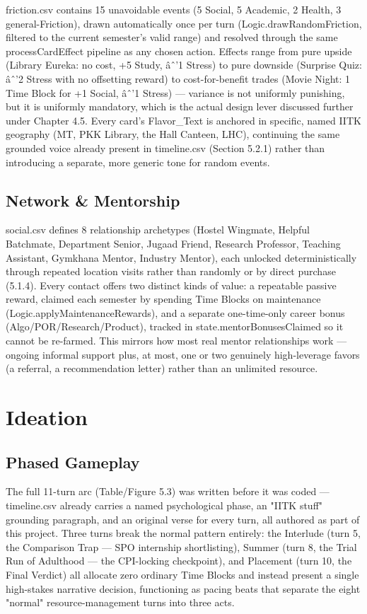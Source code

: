 friction.csv contains 15 unavoidable events (5 Social, 5 Academic, 2 Health, 3 general-Friction), drawn automatically once per turn (Logic.drawRandomFriction, filtered to the current semester's valid range) and resolved through the same processCardEffect pipeline as any chosen action. Effects range from pure upside (Library Eureka: no cost, +5 Study, âˆ'1 Stress) to pure downside (Surprise Quiz: âˆ'2 Stress with no offsetting reward) to cost-for-benefit trades (Movie Night: 1 Time Block for +1 Social, âˆ'1 Stress) --- variance is not uniformly punishing, but it is uniformly mandatory, which is the actual design lever discussed further under Chapter 4.5. Every card's Flavor_Text is anchored in specific, named IITK geography (MT, PKK Library, the Hall Canteen, LHC), continuing the same grounded voice already present in timeline.csv (Section 5.2.1) rather than introducing a separate, more generic tone for random events.

\subsection{Network & Mentorship}

social.csv defines 8 relationship archetypes (Hostel Wingmate, Helpful Batchmate, Department Senior, Jugaad Friend, Research Professor, Teaching Assistant, Gymkhana Mentor, Industry Mentor), each unlocked deterministically through repeated location visits rather than randomly or by direct purchase (5.1.4). Every contact offers two distinct kinds of value: a repeatable passive reward, claimed each semester by spending Time Blocks on maintenance (Logic.applyMaintenanceRewards), and a separate one-time-only career bonus (Algo/POR/Research/Product), tracked in state.mentorBonusesClaimed so it cannot be re-farmed. This mirrors how most real mentor relationships work --- ongoing informal support plus, at most, one or two genuinely high-leverage favors (a referral, a recommendation letter) rather than an unlimited resource.

\section{Ideation}

\subsection{Phased Gameplay}

The full 11-turn arc (Table/Figure 5.3) was written before it was coded --- timeline.csv already carries a named psychological phase, an "IITK stuff" grounding paragraph, and an original verse for every turn, all authored as part of this project. Three turns break the normal pattern entirely: the Interlude (turn 5, the Comparison Trap --- SPO internship shortlisting), Summer (turn 8, the Trial Run of Adulthood --- the CPI-locking checkpoint), and Placement (turn 10, the Final Verdict) all allocate zero ordinary Time Blocks and instead present a single high-stakes narrative decision, functioning as pacing beats that separate the eight "normal" resource-management turns into three acts.

